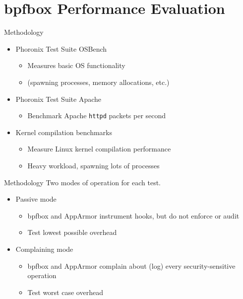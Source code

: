 \documentclass[12pt, dvipsnames, aspectratio=169]{beamer}
\begin{document}
\section{bpfbox Performance Evaluation}

\begin{frame}[c]{Methodology}
\begin{itemize}
    \item Phoronix Test Suite OSBench
    \begin{itemize}
        \item Measures basic OS functionality
        \item (spawning processes, memory allocations, etc.)
    \end{itemize}

    \vfill
    \item Phoronix Test Suite Apache
    \begin{itemize}
        \item Benchmark Apache \texttt{httpd} packets per second
    \end{itemize}

    \vfill
    \item Kernel compilation benchmarks
    \begin{itemize}
        \item Measure Linux kernel compilation performance
        \item Heavy workload, spawning lots of processes
    \end{itemize}
\end{itemize}
\end{frame}

\begin{frame}[c]{Methodology}
Two modes of operation for each test.
\vfill
\begin{itemize}
    \item Passive mode
    \begin{itemize}
        \item bpfbox and AppArmor instrument hooks, but do not enforce or audit
        \item Test lowest possible overhead
    \end{itemize}
    \vfill
    \item Complaining mode
    \begin{itemize}
        \item bpfbox and AppArmor complain about (log) every security-sensitive operation
        \item Test worst case overhead
    \end{itemize}
\end{itemize}
\end{frame}
\end{document}
